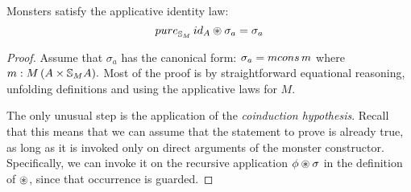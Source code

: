 \begin{lemma}
Monsters satisfy the applicative identity law:
$$
\apure_{\stream{M}}\,\id_A \appl \sigma_a = \sigma_a
$$
\end{lemma}
\begin{proof}
Assume that $\sigma_a$ has the canonical form:
$\sigma_a = \mcons\,m$ where $m:M\,(A\times \mathbb{S}_{M}A).$
Most of the proof is by straightforward equational reasoning, unfolding definitions and using the applicative laws for $M$.

The only unusual step is the application of the {\em coinduction hypothesis}.
Recall that this means that we can assume that the statement to prove is already true, as long as it is invoked only on direct arguments of the monster constructor.
Specifically, we can invoke it on the recursive application $\phi \circledast \sigma$ in the definition of $\circledast$, since that occurrence is guarded.


\end{proof}
